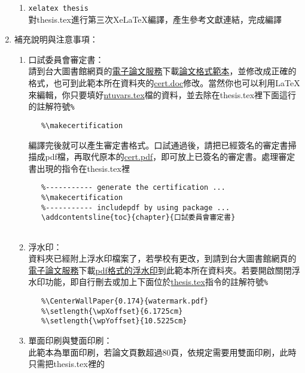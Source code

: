 \begin{acknowledgementsCH}
\begin{enumerate}[leftmargin=0pt, topsep=0pt, itemsep=0pt, label=\Roman{*}.]
\begin{enumerate}[topsep=0pt, itemsep=0pt, label=\arabic{*}.]
       \item \texttt{xelatex thesis}\\ 對thesis.tex進行第三次XeLaTeX編譯，產生參考文獻連結，完成編譯\\
   \end{enumerate} 
   \item 補充說明與注意事項：
   \begin{enumerate}[topsep=0pt, itemsep=0pt, label=$\bullet$]
       \item 口試委員會審定書：\\
       請到台大圖書館網頁的\href{http://etds.lib.ntu.edu.tw/etdsystem/submit/submitLogin}{電子論文服務}下載\href{http://gra103.aca.ntu.edu.tw/gra2007/gra/tienn/\%E5\%AD\%B8\%E4\%BD\%8D\%E8\%80\%83\%E8\%A9\%A6\%E8\%A1\%A8\%E5\%86\%8A/THESISSAMPLE.DOC}{論文格式範本}，並修改成正確的格式，也可到此範本所在資料夾的\href{run:./cert.doc}{cert.doc}修改。當然你也可以利用LaTeX來編輯，你只要填好\href{run:./ntuvars.tex}{ntuvars.tex}檔的資料，並去除在thesis.tex裡下面這行的註解符號\texttt{\%} 
       \begin{verbatim}
   %\makecertification
       \end{verbatim}
       編譯完後就可以產生審定書格式。口試通過後，請把已經簽名的審定書掃描成pdf檔，再取代原本的\href{run:./cert.pdf}{cert.pdf}，即可放上已簽名的審定書。處理審定書出現的指令在thesis.tex裡 
       \begin{verbatim}
   %----------- generate the certification ...
   %\makecertification
   %----------- includepdf by using package ...
   \addcontentsline{toc}{chapter}{口試委員會審定書}
   
       \end{verbatim}
       \item 浮水印：\\
       資料夾已經附上浮水印檔案了，若學校有更改，到請到台大圖書館網頁的\href{http://etds.lib.ntu.edu.tw/etdsystem/submit/submitLogin}{電子論文服務}下載\href{http://etds.lib.ntu.edu.tw/files/watermark.pdf}{pdf格式的浮水印}到此範本所在資料夾。若要開啟關閉浮水印功能，即自行刪去或加上下面位於\href{run:./thesis.tex}{thesis.tex}指令的註解符號\texttt{\%}
       \begin{verbatim}
   %\CenterWallPaper{0.174}{watermark.pdf}
   %\setlength{\wpXoffset}{6.1725cm}
   %\setlength{\wpYoffset}{10.5225cm}
       \end{verbatim}
       \item 單面印刷與雙面印刷：\\
       此範本為單面印刷，若論文頁數超過80頁，依規定需要用雙面印刷，此時只需把thesis.tex裡的

\end{enumerate}
\end{enumerate}
\end{acknowledgementsCH}
